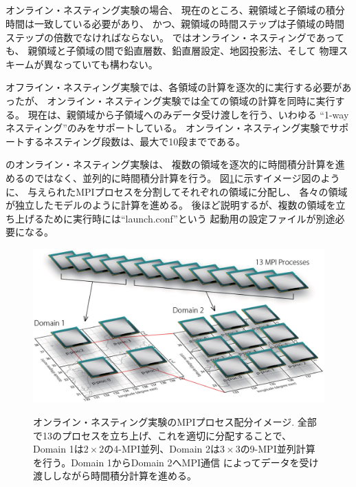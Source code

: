 \subsection{\SubsecOnlineNesting} \label{subsec:nest_online}

オンライン・ネスティング実験の場合、
現在のところ、親領域と子領域の積分時間は一致している必要があり、
かつ、親領域の時間ステップは子領域の時間ステップの倍数でなければならない。
\scalerm ではオンライン・ネスティングであっても、
親領域と子領域の間で鉛直層数、鉛直層設定、地図投影法、そして
物理スキームが異なっていても構わない。

オフライン・ネスティング実験では、各領域の計算を逐次的に実行する必要があったが、
オンライン・ネスティング実験では全ての領域の計算を同時に実行する。
現在は、親領域から子領域へのみデータ受け渡しを行う、いわゆる
``1-wayネスティング''のみをサポートしている。
オンライン・ネスティング実験でサポートするネスティング段数は、最大で10段までである。

\scalerm のオンライン・ネスティング実験は、
複数の領域を逐次的に時間積分計算を進めるのではなく、並列的に時間積分計算を行う。
図\ref{fig_mpisplit}に示すイメージ図のように、
与えられたMPIプロセスを分割してそれぞれの領域に分配し、
各々の領域が独立したモデルのように計算を進める。
後ほど説明するが、複数の領域を立ち上げるために実行時には``launch.conf''という
起動用の設定ファイルが別途必要になる。

\begin{figure}[t]
\begin{center}
  \includegraphics[width=0.8\hsize]{./figure/mpisplit_nesting.eps}\\
  \caption{オンライン・ネスティング実験のMPIプロセス配分イメージ. 全部で13のプロセスを立ち上げ、これを適切に分配することで、
           Domain 1は$2 \times 2$の4-MPI並列、Domain 2は$3 \times 3$の9-MPI並列計算を行う。Domain 1からDomain 2へMPI通信
           によってデータを受け渡ししながら時間積分計算を進める。}
  \label{fig_mpisplit}
\end{center}
\end{figure}


